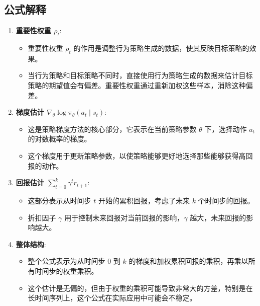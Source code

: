 \documentclass[twocolumn, 10pt]{article} %
\theoremstyle{remark}
\begin{document}
\subsection{公式解释}

\begin{enumerate}
    \item \textbf{重要性权重 \( \rho_t \)}:
    \begin{itemize}
        \item 重要性权重 \( \rho_t \) 的作用是调整行为策略生成的数据，使其反映目标策略的效果。
        \item 当行为策略和目标策略不同时，直接使用行为策略生成的数据来估计目标策略的期望值会有偏差。重要性权重通过重新加权这些样本，消除这种偏差。
    \end{itemize}

    \item \textbf{梯度估计 \( \nabla_\theta \log \pi_\theta(a_t \mid s_t) \)}:
    \begin{itemize}
        \item 这是策略梯度方法的核心部分，它表示在当前策略参数 \( \theta \) 下，选择动作 \( a_t \) 的对数概率的梯度。
        \item 这个梯度用于更新策略参数，以使策略能够更好地选择那些能够获得高回报的动作。
    \end{itemize}

    \item \textbf{回报估计 \( \sum_{t=0}^{k} \gamma^t r_{t+1} \)}:
    \begin{itemize}
        \item 这部分表示从时间步 \( t \) 开始的累积回报，考虑了未来 \( k \) 个时间步的回报。
        \item 折扣因子 \( \gamma \) 用于控制未来回报对当前回报的影响，\( \gamma \) 越大，未来回报的影响越大。
    \end{itemize}

    \item \textbf{整体结构}:
    \begin{itemize}
        \item 整个公式表示为从时间步 \( 0 \) 到 \( k \) 的梯度和加权累积回报的乘积，再乘以所有时间步的权重乘积。
        \item 这个估计是无偏的，但由于权重的乘积可能导致非常大的方差，特别是在长时间序列上，这个公式在实际应用中可能会不稳定。
    \end{itemize}
\end{enumerate}
\end{document}
